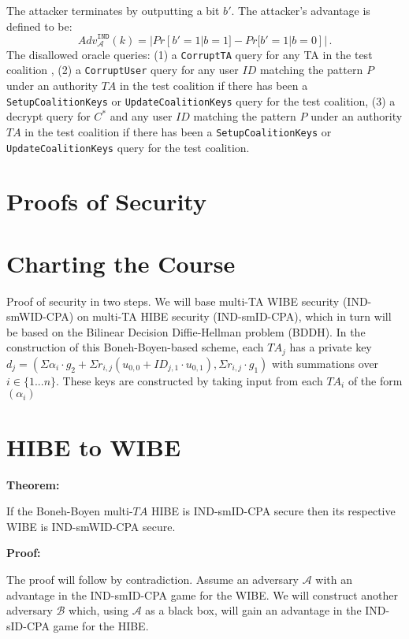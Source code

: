\documentclass[10pt]{article}
\newcommand{\A}{\mathcal{A}}
\newcommand{\B}{\mathcal{B}}
\newcommand{\ID}{\mathit{ID}}
\newcommand{\TA}{\mathit{TA}}
\newcommand{\adv}[2]{\mathit{Adv}_{#1}^{\tiny \texttt{#2}}}
\begin{document}
The attacker terminates by outputting a bit $b'$. The attacker's
advantage is defined to be:
\begin{displaymath}
\mathit{Adv}_{\A}^{\texttt{IND}}
(k) = |Pr[b'=1|b=1]-Pr[b'=1|b=0]| \, .
\end{displaymath}
The disallowed oracle queries: (1) a \texttt{CorruptTA} query for
any TA in the test coalition , (2) a \texttt{CorruptUser} query for
any user $\ID$ matching the pattern $\mathit{P}$ under an authority
$\TA$ in the test coalition if there has been a
\texttt{SetupCoalitionKeys} or \texttt{UpdateCoalitionKeys} query
for the test coalition, (3) a decrypt query for $C^{*}$ and any user
$\ID$ matching the pattern $\mathit{P}$ under an authority $\TA$ in
the test coalition if there has been a \texttt{SetupCoalitionKeys}
or \texttt{UpdateCoalitionKeys} query for the test coalition.


\section*{Proofs of Security}
\section*{Charting the Course}

Proof of security in two steps.  We will base multi-TA WIBE security (IND-smWID-CPA) on multi-TA HIBE security (IND-smID-CPA), which in turn will be based on the Bilinear Decision Diffie-Hellman problem (BDDH).  In the construction of this Boneh-Boyen-based scheme, each $\TA_j$ has a private key $d_j = (\Sigma \alpha_i \cdot g_2 + \Sigma r_{i,j}(u_{0,0} + ID_{j,1} \cdot u_{0,1}), \Sigma r_{i,j} \cdot g_1)$ with summations over $i \in \{ 1 ... n\}$.  These keys are constructed by taking input from each $\TA_i$ of the form $(\alpha_i )$

\section*{HIBE to WIBE}
\textbf{Theorem:}

If the Boneh-Boyen multi-$\TA$ HIBE is IND-smID-CPA secure then its respective WIBE is IND-smWID-CPA secure.

\textbf{Proof:}

The proof will follow by contradiction.  Assume an adversary $\A$ with an advantage in the IND-smID-CPA game for the WIBE.  We will construct another adversary $\B$ which, using $\A$ as a black box, will gain an advantage in the IND-sID-CPA game for the HIBE.
\end{document}
